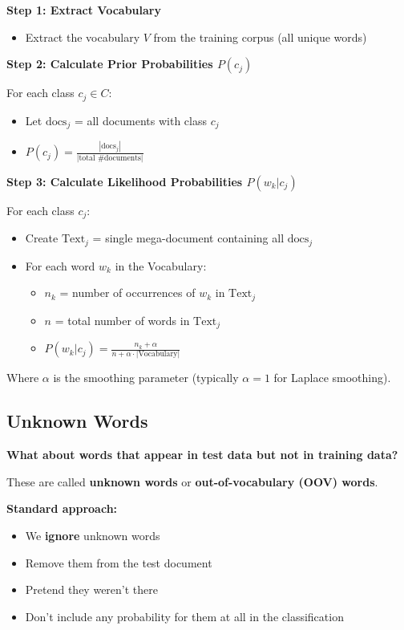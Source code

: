\documentclass[11pt,a4paper]{article}
\theoremstyle{definition}
\theoremstyle{plain}
\theoremstyle{remark}
\begin{document}
\begin{tcolorbox}[colback=blue!5!white,colframe=blue!75!black,title=\textbf{Multinomial NB Training Checklist}]
\textbf{Step 1: Extract Vocabulary}
\begin{itemize}
    \item Extract the vocabulary $V$ from the training corpus (all unique words)
\end{itemize}

\textbf{Step 2: Calculate Prior Probabilities $P(c_j)$}

For each class $c_j \in C$:
\begin{itemize}
    \item Let $\text{docs}_j$ = all documents with class $c_j$
    \item $P(c_j) = \frac{|\text{docs}_j|}{|\text{total \# documents}|}$
\end{itemize}

\textbf{Step 3: Calculate Likelihood Probabilities $P(w_k | c_j)$}

For each class $c_j$:
\begin{itemize}
    \item Create $\text{Text}_j$ = single mega-document containing all $\text{docs}_j$
    \item For each word $w_k$ in the Vocabulary:
    \begin{itemize}
        \item $n_k$ = number of occurrences of $w_k$ in $\text{Text}_j$
        \item $n$ = total number of words in $\text{Text}_j$
        \item $P(w_k | c_j) = \frac{n_k + \alpha}{n + \alpha \cdot |\text{Vocabulary}|}$
    \end{itemize}
\end{itemize}

Where $\alpha$ is the smoothing parameter (typically $\alpha = 1$ for Laplace smoothing).
\end{tcolorbox}

\subsection{Unknown Words}

\textbf{What about words that appear in test data but not in training data?}

These are called \textbf{unknown words} or \textbf{out-of-vocabulary (OOV) words}.

\textbf{Standard approach:}
\begin{itemize}
    \item We \textbf{ignore} unknown words
    \item Remove them from the test document
    \item Pretend they weren't there
    \item Don't include any probability for them at all in the classification
\end{itemize}
\end{document}

